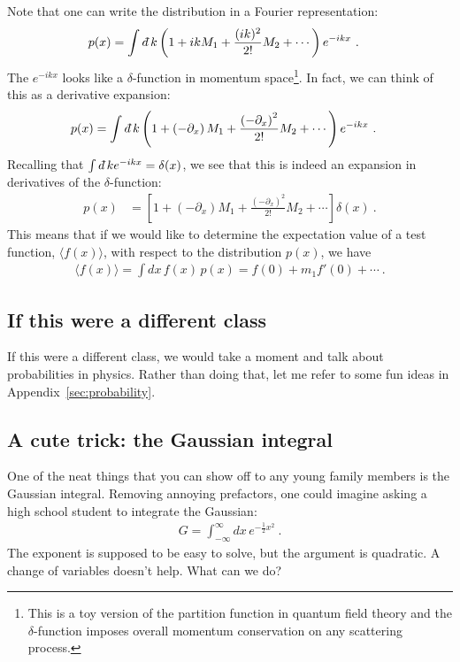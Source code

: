 \begin{example}
Note that one can write the distribution in a Fourier representation:
\begin{align}
	p(x) &= \int \dbar k 
	\left( 1+ikM_1 + \frac{(ik)^2}{2!}M_2 + \cdots \right)e^{-ikx} \ .
\end{align}
The $e^{-ikx}$ looks like a $\delta$-function in momentum space\footnote{This is a toy version of the partition function in quantum field theory and the $\delta$-function imposes overall momentum conservation on any scattering process.}. In fact, we can think of this as a derivative expansion:
\begin{align}
	p(x) &= \int \dbar k \left( 1+ \left(-\partial_x\right) M_1 + \frac{\left(-\partial_x\right)^2}{2!}M_2 + \cdots \right)e^{-ikx} \ .
\end{align}
Recalling that $\int \dbar k e^{-ikx} = \delta(x)$, we see that this is indeed an expansion in derivatives of the $\delta$-function:
\begin{align}
	p(x) &= \left[ 1+ \left(-\partial_x\right) M_1 + \frac{\left(-\partial_x\right)^2}{2!}M_2 + \cdots \right] \delta(x) \ .
\end{align}
This means that if we would like to determine the expectation value of a test function, $\langle f(x)\rangle$, with respect to the distribution $p(x)$, we have
\begin{align}
	\langle f(x)\rangle = \int dx\, f(x)\, p(x) = f(0) + m_1 f'(0) + \cdots \ .
\end{align}
\end{example}



\subsection{If this were a different class}

If this were a different class, we would take a moment and talk about probabilities in physics. Rather than doing that, let me refer to some fun ideas in Appendix~\ref{sec:probability}.

\subsection{A cute trick: the Gaussian integral}

One of the neat things that you can show off to any young family members is the Gaussian integral. Removing annoying prefactors, one could imagine asking a high school student to integrate the Gaussian:
\begin{align}
	G = \int_{-\infty}^\infty dx\, e^{-\frac{1}{2}x^2} \ .
\end{align}
The exponent is supposed to be easy to solve, but the argument is quadratic. A change of variables doesn't help. What can we do?

